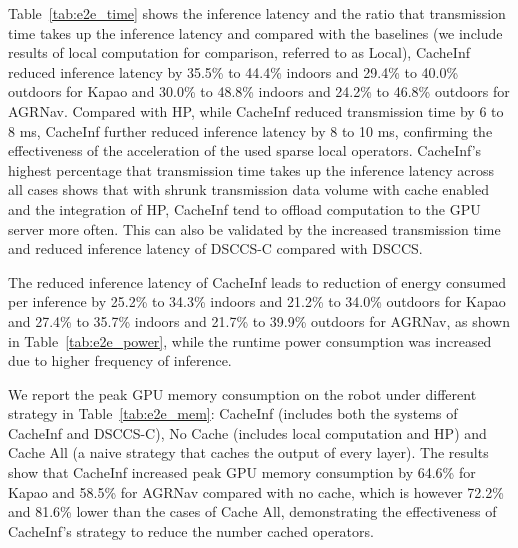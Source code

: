 Table~\ref{tab:e2e_time} shows the inference latency and the ratio that transmission time takes up the inference latency and compared with the baselines (we include results of local computation for comparison, referred to as Local), CacheInf reduced inference latency by 35.5\% to 44.4\% indoors and 29.4\% to 40.0\% outdoors for Kapao and 30.0\% to 48.8\% indoors and 24.2\% to 46.8\% outdoors for AGRNav.
Compared with HP, while CacheInf reduced transmission time by 6 to 8 ms, CacheInf further reduced inference latency by 8 to 10 ms, confirming the effectiveness of the acceleration of the used sparse local operators.
CacheInf's highest percentage that transmission time takes up the inference latency across all cases shows that with shrunk transmission data volume with cache enabled and the integration of HP, CacheInf tend to offload computation to the GPU server more often.
This can also be validated by the increased transmission time and reduced inference latency of DSCCS-C compared with DSCCS.

The reduced inference latency of CacheInf leads to reduction of energy consumed per inference by 25.2\% to 34.3\% indoors and 21.2\% to 34.0\% outdoors for Kapao and 27.4\% to 35.7\% indoors and 21.7\% to 39.9\% outdoors for AGRNav, as shown in Table~\ref{tab:e2e_power}, while the runtime power consumption was increased due to higher frequency of inference.

We report the peak GPU memory consumption on the robot under different strategy in Table~\ref{tab:e2e_mem}: CacheInf (includes both the systems of CacheInf and DSCCS-C), No Cache (includes local computation and HP) and Cache All (a naive strategy that caches the output of every layer).
The results show that CacheInf increased peak GPU memory consumption by 64.6\% for Kapao and 58.5\% for AGRNav compared with no cache, which is however 72.2\% and 81.6\% lower than the cases of Cache All, demonstrating the effectiveness of CacheInf's strategy to reduce the number cached operators.


